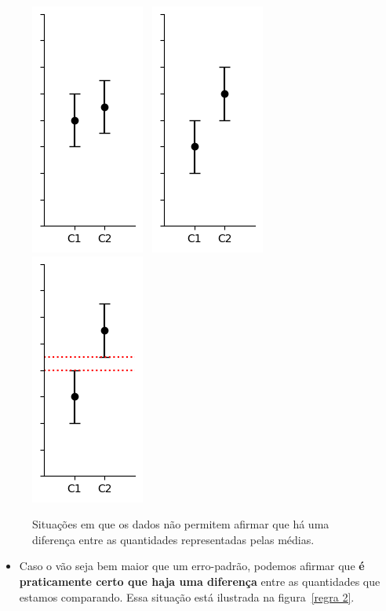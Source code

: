 \documentclass[12pt, a4paper]{article}
\begin{document}
\begin{figure}[H]
    \centering
    \includegraphics[width=0.22\linewidth]{regra 1.1.png}~
    \includegraphics[width=0.22\linewidth]{regra 1.2.png}~
    \includegraphics[width=0.22\linewidth]{regra 1.3.png}
    \caption{Situações em que os dados não permitem afirmar que há uma diferença entre as quantidades representadas pelas médias.}
    \label{regra 1}
\end{figure}

\smallskip

\begin{itemize}
\item Caso o vão seja bem maior que um erro-padrão, podemos afirmar que \textbf{é praticamente certo que haja uma diferença} entre as quantidades que estamos comparando. Essa situação está ilustrada na figura~\ref{regra 2}. 
\end{itemize}
\end{document}
